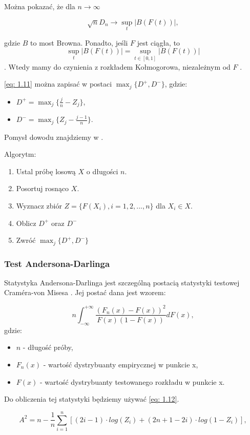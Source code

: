 \documentclass{article}
\theoremstyle{break}
\numberwithin{equation}{subsection}
\numberwithin{figure}{section}
\begin{document}
Można pokazać, że dla $n\rightarrow\infty$

$$\sqrt{n}D_n \rightarrow \sup_t|B(F(t))|,$$

gdzie $B$ to most Browna. Ponadto, jeśli $F$ jest ciągła, to $$\sup_t|B(F(t))|=\sup_{t\in[0,1]}|B(F(t))|$$.
Wtedy mamy do czynienia z rozkładem Kołmogorowa, niezależnym od $F$ \cite{R. M. Dudley}.

\eqref{eq: 1.11} można zapisać w postaci $\max_j \{D^{+}, D^{-}\}$, gdzie:

\begin{itemize}
\item $D^{+} = \max_j\{\frac{j}{n} - Z_j\}$,
\item $D^{-} = \max_j\{Z_j - \frac{j-1}{n}\}$.
\end{itemize}

Pomysł dowodu znajdziemy w \cite{goodnes}.

Algorytm:

\begin{enumerate}
\item Ustal próbę losową $X$ o długości $n$.
\item Posortuj rosnąco $X$.
\item Wyznacz zbiór $Z = \{F(X_i), i = 1, 2, ..., n\}$ dla $X_i \in X$.
\item Oblicz $D^{+}$ oraz $D^{-}$
\item Zwróć $\max_j \{D^{+}, D^{-}\}$
\end{enumerate}

\subsubsection{Test Andersona-Darlinga}

Statystyka Andersona-Darlinga jest szczególną postacią statystyki testowej Craméra-von Misesa \cite{burnecki}.
Jej postać dana jest wzorem:

$$n\int_{-\infty}^{+\infty} \frac{(F_n(x) - F(x))^2}{F(x)(1-F(x))}dF(x),$$ gdzie:


\begin{itemize}
\item $n$ - długość próby,
\item $F_n(x)$ - wartość dystrybuanty empirycznej w punkcie x,
\item $F(x)$ - wartość dystrybuanty testowanego rozkładu w punkcie x.
\end{itemize}
Do obliczenia tej statystyki będziemy używać \eqref{eq: 1.12}.

\begin{equation}
A^2 = n - \frac{1}{n}\sum_{i=1}^{n}[(2i-1)\cdot log(Z_i) + (2n+1-2i)\cdot log(1-Z_i)], \label{eq: 1.12}
\end{equation}
\end{document}
